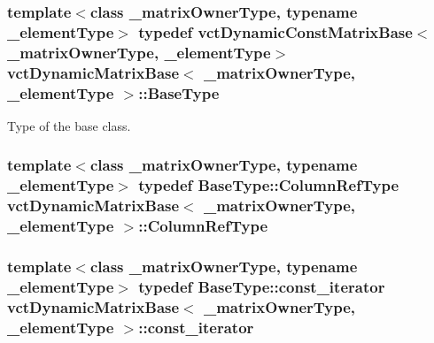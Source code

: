 \subsubsection[{Base\+Type}]{\setlength{\rightskip}{0pt plus 5cm}template$<$class \+\_\+matrix\+Owner\+Type, typename \+\_\+element\+Type$>$ typedef {\bf vct\+Dynamic\+Const\+Matrix\+Base}$<$\+\_\+matrix\+Owner\+Type, \+\_\+element\+Type$>$ {\bf vct\+Dynamic\+Matrix\+Base}$<$ \+\_\+matrix\+Owner\+Type, \+\_\+element\+Type $>$\+::{\bf Base\+Type}}\label{classvct_dynamic_matrix_base_a6285355f814f82089376c6819d127fd4}
Type of the base class. \hypertarget{classvct_dynamic_matrix_base_a6fabbe3b8fdbfbb4a53f90622a520699}{}
\subsubsection[{Column\+Ref\+Type}]{\setlength{\rightskip}{0pt plus 5cm}template$<$class \+\_\+matrix\+Owner\+Type, typename \+\_\+element\+Type$>$ typedef {\bf Base\+Type\+::\+Column\+Ref\+Type} {\bf vct\+Dynamic\+Matrix\+Base}$<$ \+\_\+matrix\+Owner\+Type, \+\_\+element\+Type $>$\+::{\bf Column\+Ref\+Type}}\label{classvct_dynamic_matrix_base_a6fabbe3b8fdbfbb4a53f90622a520699}
\hypertarget{classvct_dynamic_matrix_base_a63eb2ea8f5972efe2f125a8c22b46670}{}
\subsubsection[{const\+\_\+iterator}]{\setlength{\rightskip}{0pt plus 5cm}template$<$class \+\_\+matrix\+Owner\+Type, typename \+\_\+element\+Type$>$ typedef {\bf Base\+Type\+::const\+\_\+iterator} {\bf vct\+Dynamic\+Matrix\+Base}$<$ \+\_\+matrix\+Owner\+Type, \+\_\+element\+Type $>$\+::{\bf const\+\_\+iterator}}\label{classvct_dynamic_matrix_base_a63eb2ea8f5972efe2f125a8c22b46670}
\hypertarget{classvct_dynamic_matrix_base_a98a8a7626647cf9dfef10d6b7f7cc9af}{}
